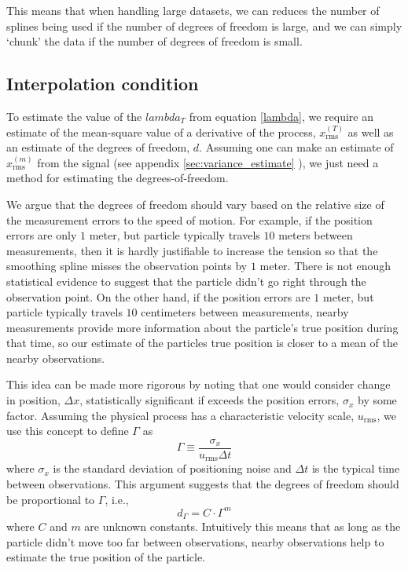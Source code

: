 \documentclass[10pt,journal]{IEEEtran}
\begin{document}
This means that when handling large datasets, we can reduces the number of splines being used if the number of degrees of freedom is large, and we can simply `chunk' the data if the number of degrees of freedom is small.

\subsection{Interpolation condition} \label{interpolation_condition}

To estimate the value of the $lambda_T$ from equation \ref{lambda}, we require an estimate of the mean-square value of a derivative of the process, $x_{\textrm{rms}}^{(T)}$ as well as an estimate of the degrees of freedom, $d$. Assuming one can make an estimate of $x_{\textrm{rms}}^{(m)}$ from the signal (see appendix \ref{sec:variance_estimate} ), we just need a method for estimating the degrees-of-freedom.

We argue that the degrees of freedom should vary based on the relative size of the measurement errors to the speed of motion. For example, if the position errors are only $1$ meter, but particle typically travels $10$ meters between measurements, then it is hardly justifiable to increase the tension so that the smoothing spline misses the observation points by $1$ meter. There is not enough statistical evidence to suggest that the particle didn't go right through the observation point. On the other hand, if the position errors are  $1$ meter, but particle typically travels $10$ centimeters between measurements, nearby measurements provide more information about the particle's true position during that time, so our estimate of the particles true position is closer to a mean of the nearby observations.

This idea can be made more rigorous by noting that one would consider change in position, $\Delta x$, statistically significant if exceeds the position errors, $\sigma_x$ by some factor.  Assuming the physical process has a characteristic velocity scale, $u_{\textrm{rms}}$, we use this concept to define $\Gamma$ as
\begin{equation}
\label{gamma_equation}
\Gamma \equiv \frac{\sigma_x}{u_{\textrm{rms}}\Delta t}
\end{equation}
where $\sigma_x$ is the standard deviation of positioning noise and $\Delta t$ is the typical time between observations. This argument suggests that the degrees of freedom should be proportional to $\Gamma$, i.e.,
\begin{equation}
d_\Gamma = C \cdot \Gamma^m
\end{equation}
where $C$ and $m$ are unknown constants. Intuitively this means that as long as the particle didn't move too far between observations, nearby observations help to estimate the true position of the particle.
\end{document}

